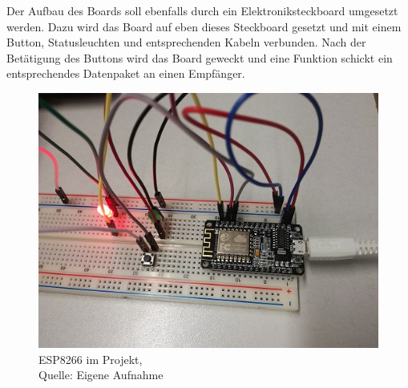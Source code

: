 Der Aufbau des Boards soll ebenfalls durch ein Elektroniksteckboard umgesetzt werden. Dazu wird das Board auf eben dieses Steckboard gesetzt und mit einem Button, Statusleuchten und entsprechenden Kabeln verbunden. Nach der Betätigung des Buttons wird das Board geweckt und eine Funktion schickt ein entsprechendes Datenpaket an einen Empfänger.
\begin{figure}[!htb]
	\centering
	\includegraphics[scale=0.5]{ESP_Projekt.jpg}
	\caption[ESP8266 im Projekt]{ESP8266 im Projekt,\\ Quelle: Eigene Aufnahme}
\end{figure}
\newpage


 
